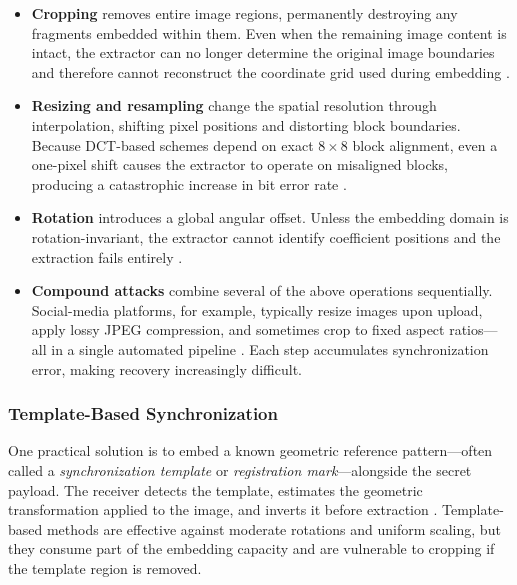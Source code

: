 \documentclass[12pt,a4paper,oneside]{report}
\begin{document}
	\begin{itemize}
		\item \textbf{Cropping} removes entire image regions, permanently destroying any fragments
		embedded within them. Even when the remaining image content is intact, the extractor
		can no longer determine the original image boundaries and therefore cannot reconstruct
		the coordinate grid used during embedding \cite{petitcolas1999information}.
		
		\item \textbf{Resizing and resampling} change the spatial resolution through interpolation,
		shifting pixel positions and distorting block boundaries. Because DCT-based schemes
		depend on exact $8\times8$ block alignment, even a one-pixel shift causes the
		extractor to operate on misaligned blocks, producing a catastrophic increase in
		bit error rate \cite{cox2007digital}.
		
		\item \textbf{Rotation} introduces a global angular offset. Unless the embedding domain
		is rotation-invariant, the extractor cannot identify coefficient positions and the
		extraction fails entirely \cite{ruanaidh1998rotation}.
		
		\item \textbf{Compound attacks} combine several of the above operations sequentially.
		Social-media platforms, for example, typically resize images upon upload, apply
		lossy JPEG compression, and sometimes crop to fixed aspect ratios—all in a single
		automated pipeline \cite{Fridrich2012}. Each step accumulates synchronization error,
		making recovery increasingly difficult.
	\end{itemize}
	
	\subsubsection{Template-Based Synchronization}
	
	One practical solution is to embed a known geometric reference pattern—often called a
	\emph{synchronization template} or \emph{registration mark}—alongside the secret payload.
	The receiver detects the template, estimates the geometric transformation applied to the
	image, and inverts it before extraction \cite{ruanaidh1998rotation}.
	Template-based methods are effective against moderate rotations and uniform scaling,
	but they consume part of the embedding capacity and are vulnerable to cropping if the
	template region is removed.
	
\end{document}
